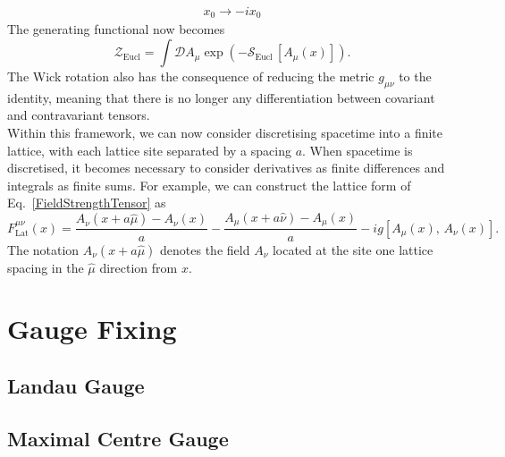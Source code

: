 \begin{align*}
x_0\rightarrow -ix_0
\end{align*}
The generating functional now becomes 
\begin{equation}
\mathcal{Z}_{\text{Eucl}} =\int \mathcal{D} A_\mu \exp\left(-\mathcal{S}_{\text{Eucl}}\,[A_\mu(x)]\right).
\end{equation}
The Wick rotation also has the consequence of reducing the metric $g_{\mu\nu}$ to the identity, meaning that there is no longer any differentiation between covariant and contravariant tensors.\\

Within this framework, we can now consider discretising spacetime into a finite lattice, with each lattice site separated by a spacing $a$. When spacetime is discretised, it becomes necessary to consider derivatives as finite differences and integrals as finite sums. For example, we can construct the lattice form of Eq.~\ref{FieldStrengthTensor} as
\begin{equation}
F_{\text{Lat}}^{\mu\nu}(x) = \frac{A_\nu(x+a\hat{\mu})-A_\nu(x)}{a}-\frac{A_\mu(x+a\hat{\nu})-A_\mu(x)}{a}-ig[A_\mu(x),\,A_\nu(x)].
\label{DiscreteFST}
\end{equation}
The notation $A_\nu(x+a\hat{\mu})$ denotes the field $A_\nu$ located at the site one lattice spacing in the $\hat{\mu}$ direction from $x$.
\section{Gauge Fixing}
\subsection{Landau Gauge}
\subsection{Maximal Centre Gauge}


